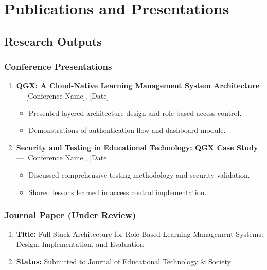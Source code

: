 \documentclass[11pt,a4paper]{article}
\begin{document}
\endgroup


\newpage
\appendix
\section{Publications and Presentations}

\subsection{Research Outputs}

\subsubsection{Conference Presentations}

\begin{enumerate}
    \item \textbf{QGX: A Cloud-Native Learning Management System Architecture} --- [Conference Name], [Date]
    \begin{itemize}
        \item Presented layered architecture design and role-based access control.
        \item Demonstrations of authentication flow and dashboard module.
    \end{itemize}

    \item \textbf{Security and Testing in Educational Technology: QGX Case Study} --- [Conference Name], [Date]
    \begin{itemize}
        \item Discussed comprehensive testing methodology and security validation.
        \item Shared lessons learned in access control implementation.
    \end{itemize}
\end{enumerate}

\subsubsection{Journal Paper (Under Review)}

\begin{enumerate}
    \item \textbf{Title:} Full-Stack Architecture for Role-Based Learning Management Systems: Design, Implementation, and Evaluation
    \item \textbf{Status:} Submitted to Journal of Educational Technology \& Society
\end{enumerate}
\end{document}
